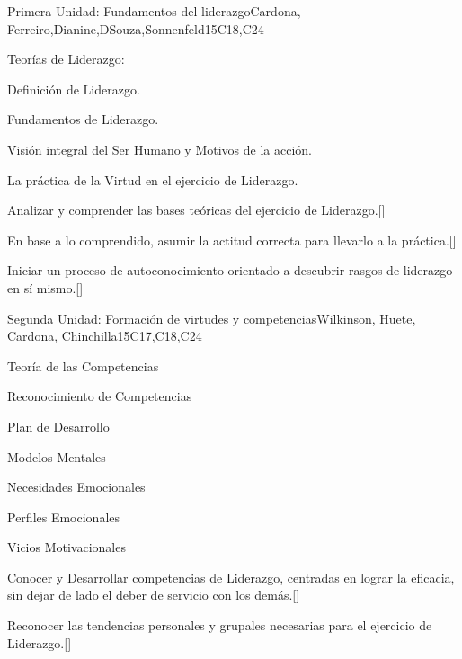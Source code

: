\begin{syllabus}
\begin{unit}{}{Primera Unidad: Fundamentos del liderazgo}{Cardona, Ferreiro,Dianine,DSouza,Sonnenfeld}{15}{C18,C24}
\begin{topics}
	\item Teorías de Liderazgo: 
	\item Definición de Liderazgo.
	\item Fundamentos de Liderazgo.
	\item Visión integral del Ser Humano y Motivos de la acción.
	\item La práctica de la Virtud en el ejercicio de Liderazgo.
\end{topics}
\begin{learningoutcomes}
	\item Analizar y comprender las bases teóricas del ejercicio de Liderazgo.[\Familiarity]
	\item En base a lo comprendido, asumir la actitud correcta para llevarlo a la práctica.[\Familiarity]
	\item Iniciar un proceso de autoconocimiento orientado a descubrir rasgos de liderazgo en sí mismo.[\Familiarity]
\end{learningoutcomes}
\end{unit}

\begin{unit}{}{Segunda Unidad: Formación de virtudes y competencias}{Wilkinson, Huete, Cardona, Chinchilla}{15}{C17,C18,C24}
\begin{topics}
	
	\item Teoría de las Competencias 
	\item Reconocimiento de Competencias
	\item Plan de Desarrollo
	\item Modelos Mentales
	\item Necesidades Emocionales
	\item Perfiles Emocionales
	\item Vicios Motivacionales

\end{topics}
\begin{learningoutcomes}
	\item Conocer y Desarrollar competencias de Liderazgo, centradas en lograr la eficacia, sin dejar de lado el deber de servicio con los demás.[\Familiarity]
	\item Reconocer las tendencias personales y grupales necesarias para el ejercicio de Liderazgo.[\Familiarity]
\end{learningoutcomes}
\end{unit}


\end{syllabus}
